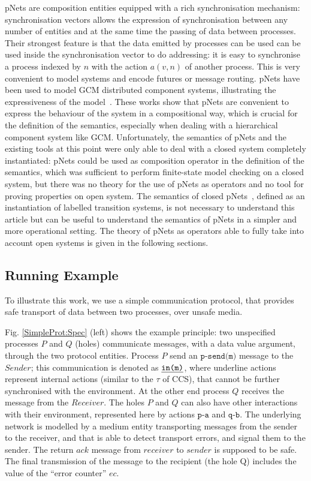 \documentclass{lmcs}
\begin{document}
pNets are composition entities equipped with a rich synchronisation mechanism: synchronisation vectors allows the expression of synchronisation between any number of entities and at the same time the passing of data between processes. Their strongest feature is that the data emitted by processes can be used can be used inside the synchronisation vector to do addressing: it is easy to synchronise a process indexed by $n$ with the action $a(v,n)$ of another process. This is very convenient to model systems and encode futures or message routing. pNets have been used to model GCM distributed component systems, illustrating the expressiveness of the model~\cite{AmeurBoulifa2017}. These works show that pNets are convenient to express the behaviour of the system in a compositional way, which is crucial for the definition of the semantics, especially when dealing with a hierarchical component system like GCM. Unfortunately, the semantics of pNets and the existing tools at this point were only able to deal with a closed system completely instantiated: pNets could be used as composition operator in the definition of the semantics, which was sufficient to perform finite-state model checking on a closed system, but there was no theory for the use of pNets as operators and no tool for proving properties on open system. The semantics of closed pNets~\cite{AmeurBoulifa2017}, defined as an instantiation of labelled transition systems, is not necessary to understand this article but can be useful to  understand the semantics of pNets in a simpler and more operational setting. The theory of pNets as operators able to fully take into account open systems is given in the following sections.

\subsection{Running Example}
To illustrate this work, we use a simple communication protocol, that provides safe transport of data between two processes, over unsafe media. 

Fig. \ref{SimpleProt:Spec} (left) shows the example principle: two unspecified
processes $P$ and $Q$ (holes) communicate messages, with a data value
argument, through the two protocol entities. Process $P$ send an $\texttt{p-send(m)}$ message to the $Sender$; this communication is denoted as $\texttt{\underline{in(m)}}$, where underline actions represent internal actions (similar to the $\tau$ of CCS), that cannot be further synchronised with the environment. At the other end process $Q$ receives the message from the $Receiver$. The holes $P$ and $Q$ can also have other interactions with their environment, represented here by actions $\texttt{p-a}$ and $\texttt{q-b}$. The underlying network is modelled by a medium entity transporting messages from the sender to the receiver, and that is able to detect transport errors, and signal them to the sender. The return $ack$ message from $receiver$ to $sender$ is supposed to be safe. The final transmission of the message to the recipient (the hole Q) includes the value of the ``error counter'' $ec$.
\end{document}
